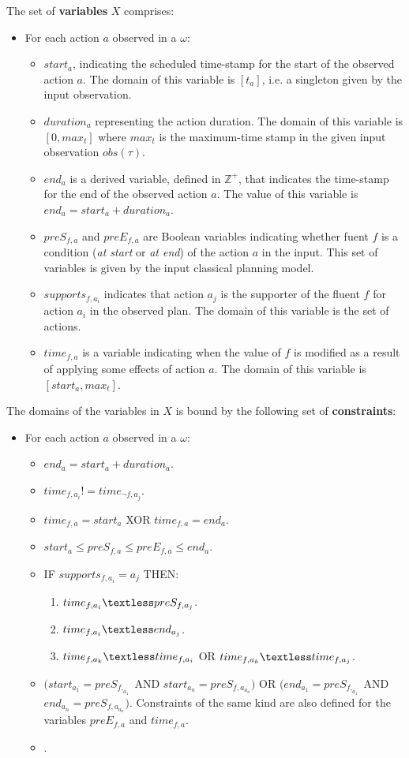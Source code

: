 \documentclass[letterpaper]{article} %
\begin{document}
The set of {\bf variables} $X$ comprises:
\begin{itemize}
\item For each action $a$ observed in a $\omega$:
\begin{itemize}
\item $start_a$, indicating the scheduled time-stamp for the start of the observed action $a$. The domain of this variable is $[t_a]$, i.e. a singleton given by the input observation.
\item $duration_a$ representing the action duration. The domain of this variable is $[0,max_t]$ where $max_t$ is the maximum-time stamp in the given input observation $obs(\tau)$.
\item $end_a$ is a derived variable, defined in $\mathds{Z}^+$, that indicates the time-stamp for the end of the observed action $a$. The value of this variable is $end_a = start_a + duration_a$. 
\item $preS_{f,a}$ and $preE_{f,a}$ are Boolean variables indicating whether fuent $f$ is a condition ({\em at start} or {\em at end}) of the action $a$ in the input. This set of variables is given by the input classical planning model.
\item $supports_{f,a_i}$ indicates that action $a_j$ is the supporter of the fluent $f$ for action $a_i$ in the observed plan. The domain of this variable is the set of actions.
\item $time_{f,a}$ is a variable indicating when the value of $f$ is modified as a result of applying some effects of action $a$. The domain of this variable is $[start_a,max_t]$.
\end{itemize}
\end{itemize}

The domains of the variables in $X$ is bound by the following set of {\bf constraints}:
\begin{itemize}
\item For each action $a$ observed in a $\omega$:
\begin{itemize}
\item $end_a = start_a + duration_a$.
\item $time_{f,a_i}!=time_{\neg f,a_j}$.
\item $time_{f,a}= start_a$ XOR $time_{f,a}= end_a$.
\item $start_a\leq preS_{f,a}\leq preE_{f,a}\leq end_a$.
\item IF $supports_{f,a_i}=a_j$ THEN:
\begin{enumerate}
\item $time_{f,a_i}\textless  preS_{f,a_j}$.
\item $time_{f,a_i}\textless  end_{a_j}$.
\item $time_{f,a_k}\textless time_{f,a_i}$ OR $time_{f,a_k}\textless time_{f,a_j}$.
\end{enumerate}
\item $(start_{a_1} = preS_{f,_{a_1}}$ AND $start_{a_n} = preS_{f,a_{a_n}})$ OR $(end_{a_1} = preS_{f,_{a_1}}$ AND $end_{a_n} = preS_{f,a_{a_n}})$. Constraints of the same kind are also defined for the variables $preE_{f,a}$ and $time_{f,a}$.
\item .
\end{itemize}
\end{itemize}
\end{document}
